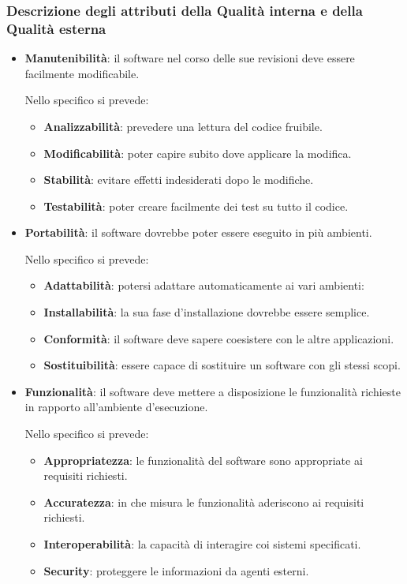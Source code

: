 		\subsubsection{Descrizione degli attributi della Qualità interna e della Qualità esterna}
		\begin{itemize}
			\item \textbf{Manutenibilità}: il software nel corso delle sue revisioni deve essere facilmente modificabile.
			
			Nello specifico si prevede:
			
			\begin{itemize}
				\item \textbf{Analizzabilità}: prevedere una lettura del codice fruibile.
				\item \textbf{Modificabilità}: poter capire subito dove applicare la modifica.
				\item \textbf{Stabilità}: evitare effetti indesiderati dopo le modifiche.
				\item \textbf{Testabilità}: poter creare facilmente dei test su tutto il codice.
			\end{itemize}
		
			\item \textbf{Portabilità}: il software dovrebbe poter essere eseguito in più ambienti.
			
			Nello specifico si prevede:
			
			\begin{itemize}
				\item \textbf{Adattabilità}: potersi adattare automaticamente ai vari ambienti:
				\item \textbf{Installabilità}: la sua fase d'installazione dovrebbe essere semplice.
				\item \textbf{Conformità}: il software deve sapere coesistere con le altre applicazioni.
				\item \textbf{Sostituibilità}: essere capace di sostituire un software con gli stessi scopi.
			\end{itemize}
		
			\item \textbf{Funzionalità}: il software deve mettere a disposizione le funzionalità richieste in rapporto all'ambiente d'esecuzione.
			
			Nello specifico si prevede:
			
			\begin{itemize}
				\item \textbf{Appropriatezza}: le funzionalità del software sono appropriate ai requisiti richiesti.
				\item \textbf{Accuratezza}: in che misura le funzionalità aderiscono ai requisiti richiesti.
				\item \textbf{Interoperabilità}: la capacità di interagire coi sistemi specificati.
				\item \textbf{Security}: proteggere le informazioni da agenti esterni.
			\end{itemize}
		

\end{itemize}
